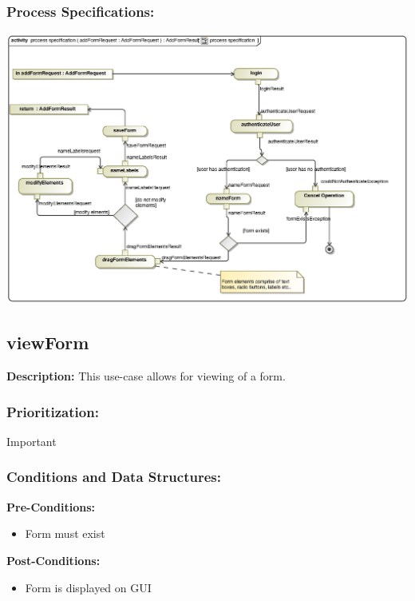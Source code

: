 \subsubsection{Process Specifications:} 
\includegraphics[width=1\linewidth]{./Graphics/FormUseCaseDiagrams/processpecification_AddForm}



\subsection{viewForm}
\textbf{Description:}
This use-case allows for viewing of a form.
\subsubsection{Prioritization:}
Important
\subsubsection{Conditions and Data Structures:}
\textbf{Pre-Conditions:}
\begin{itemize}
	\item Form must exist
\end{itemize}

\textbf{Post-Conditions:}	
\begin{itemize}
	\item Form is displayed on GUI
\end{itemize}
